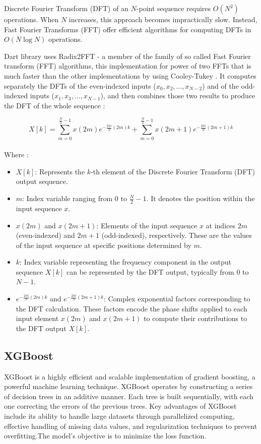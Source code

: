 \documentclass{ieeeojies}
\begin{document}
Discrete Fourier Transform (DFT) of an \( N \)-point sequence requires \( O(N^2) \) operations. When \( N \) increases, this approach becomes impractically slow. Instead, Fast Fourier Transforms (FFT) offer efficient algorithms for computing DFTs in \( O(N \log N) \) operations.

Dart library uses Radix2FFT - a member of the family of so called Fast Fourier transform (FFT) algorithms, this implementation for power of two FFTs that is much faster than the other implementations by using Cooley-Tukey \cite{dark}. It computes separately the DFTs of the even-indexed inputs (\( x_0, x_2, \ldots, x_{N-2} \)) and of the odd-indexed inputs (\( x_1, x_3, \ldots, x_{N-1} \)), and then combines those two results to produce the DFT of the whole sequence \cite{radix}:

\[
X[k] = \sum_{m=0}^{\frac{N}{2}-1} x(2m) e^{-\frac{2\pi i}{N} (2m)k} + \sum_{m=0}^{\frac{N}{2}-1} x(2m+1) e^{-\frac{2\pi i}{N} (2m+1)k}\]
\\Where : 
\begin{itemize}
    \item $X[k]$: Represents the \( k \)-th element of the Discrete Fourier Transform (DFT) output sequence.
    \item \( m \): Index variable ranging from \( 0 \) to \( \frac{N}{2}-1 \). It denotes the position within the input sequence \( x \).
    \item \( x(2m) \) and \( x(2m+1) \): Elements of the input sequence \( x \) at indices \( 2m \) (even-indexed) and \( 2m+1 \) (odd-indexed), respectively. These are the values of the input sequence at specific positions determined by \( m \).
    \item \( k \): Index variable representing the frequency component in the output sequence \( X[k] \) can be represented by the DFT output, typically from \( 0 \) to \( N-1 \).
    \item \( e^{-\frac{2\pi i}{N} (2m)k} \) and \( e^{-\frac{2\pi i}{N} (2m+1)k} \): Complex exponential factors corresponding to the DFT calculation. These factors encode the phase shifts applied to each input element \( x(2m) \) and \( x(2m+1) \) to compute their contributions to the DFT output \( X[k] \).
\end{itemize}

\subsection{XGBoost}
XGBoost is a highly efficient and scalable implementation of gradient boosting, a powerful machine learning technique. XGBoost operates by constructing a series of decision trees in an additive manner. Each tree is built sequentially, with each one correcting the errors of the previous trees. Key advantages of XGBoost include its ability to handle large datasets through parallelized computing, effective handling of missing data values, and regularization techniques to prevent overfitting\cite{Xgboost}.The model’s objective is to minimize the loss function. 
\end{document}
